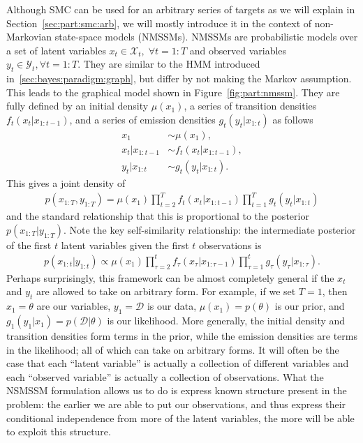 Although SMC can be used for an arbitrary series of targets as we will explain
in Section~\ref{sec:part:smc:arb}, we will mostly introduce it in the context of non-Markovian state-space
models (NMSSMs).  NMSSMs are probabilistic models over a set of latent variables 
$x_t \in \mathcal{X}_t, \; \forall t = 1:T$
and observed variables $y_t \in \mathcal{Y}_t, \forall t = 1:T$.  
They are similar to
the HMM introduced in~\ref{sec:bayes:paradigm:graph}, but differ by not
making the Markov assumption.  This leads to the graphical model shown in Figure~\ref{fig:part:nmssm}.
They are fully defined by an initial density $\mu (x_1)$,
a series of transition densities $f_{t} (x_t | x_{1:t-1})$, and a series of
emission densities $g_{t} (y_t | x_{1:t})$ as follows
\begin{subequations}
\label{eq:part:ssm}
\begin{align}
x_1 &\sim \mu(x_1), \\
x_t | x_{1:t - 1} &\sim f_{t}(x_t | x_{1:t - 1}), \\
y_t | x_{1:t} &\sim g_{t}(y_t | x_{1:t}).
\end{align}
\end{subequations}
This gives a joint density of
\begin{align}
\label{eq:part:jointdistribution}
p(x_{1:T}, y_{1:T}) = \mu(x_1) \prod_{t = 2}^T f_{t}(x_t | x_{1:t - 1}) \prod_{t = 1}^T g_{t}(y_t | x_{1:t})
\end{align}
and the standard relationship that this is proportional to the posterior
$p(x_{1:T} | y_{1:T})$.  Note the
key self-similarity relationship: the intermediate posterior of the first $t$ latent variables
given the first $t$ observations is
\begin{align*}
p(x_{1:t} | y_{1:t}) \propto \mu(x_1) \prod_{\tau = 2}^t f_{\tau}(x_{\tau} | x_{1:\tau - 1}) \prod_{\tau = 1}^t g_{\tau}(y_{\tau} | x_{1:\tau}).
\end{align*}
Perhaps surprisingly, this framework can be almost completely general if the $x_t$ and $y_t$
are allowed to take on arbitrary form.  For example, if we set $T=1$, then $x_1=\theta$ are our variables,
$y_1 = \mathcal{D}$ is our data, $\mu(x_1) = p(\theta)$ is our prior, and $g_1(y_1|x_1)=p(\mathcal{D}|\theta)$
is our likelihood.  More generally, the initial density and transition densities form terms in the
prior, while the emission densities are terms in the likelihood; all of which can take on arbitrary forms.
It will often be the case that each ``latent variable'' is actually a collection of different variables and
each ``observed variable'' is actually a collection of observations.
What the NSMSSM formulation allows us to do is express known structure present in the problem: 
the earlier we are able to put our observations, and thus express their conditional
independence from more of the latent variables, the more will be able to exploit this structure.

